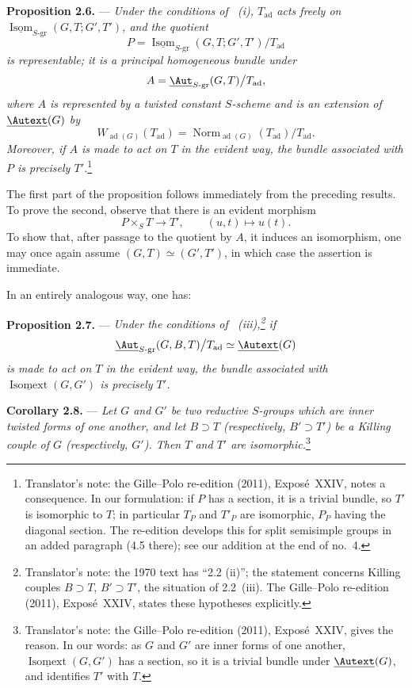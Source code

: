\medskip\noindent\textbf{Proposition 2.6.} ---
{\itshape Under the conditions of ~\textup{(i)},
\(T_{\mathrm{ad}}\) acts freely on
\(\underline{\operatorname{Isom}}_{S\text{-}\mathrm{gr}}
(G,T;G',T')\), and the quotient}
\[
  P=
  \underline{\operatorname{Isom}}_{S\text{-}\mathrm{gr}}
    (G,T;G',T')
  \big/T_{\mathrm{ad}}
\]
{\itshape is representable; it is a principal homogeneous bundle under}
\[
  A=
  \underline{\Aut}_{S\text{-}\mathrm{gr}}(G,T)
  \big/T_{\mathrm{ad}},
\]
{\itshape where \(A\) is represented by a twisted constant \(S\)-scheme
and is an extension of \(\underline{\Autext}(G)\) by}
\[
  W_{\operatorname{ad}(G)}(T_{\mathrm{ad}})
  =
  \operatorname{Norm}_{\operatorname{ad}(G)}(T_{\mathrm{ad}})
  \big/T_{\mathrm{ad}}.
\]
{\itshape Moreover, if \(A\) is made to act on \(T\) in the evident
way, the bundle associated with \(P\) is precisely \(T'\).}\footnote{Translator's note: the Gille--Polo re-edition (2011), Exposé~XXIV, notes a
consequence. In our formulation: if \(P\) has a section, it is a trivial bundle, so \(T'\) is
isomorphic to \(T\); in particular \(T_P\) and \(T'_P\) are isomorphic, \(P_P\) having the
diagonal section. The re-edition develops this for split semisimple groups in an added
paragraph (4.5 there); see our addition at the end of no.~4.}

The first part of the proposition follows immediately from the
preceding results. To prove the second, observe that there is an
evident morphism
\[
  P\times_S T\longrightarrow T',
  \qquad (u,t)\longmapsto u(t).
\]
To show that, after passage to the quotient by \(A\), it induces an
isomorphism, one may once again assume
\((G,T)\simeq(G',T')\), in which case the assertion is immediate.

In an entirely analogous way, one has:

\medskip\noindent\textbf{Proposition 2.7.} ---
{\itshape Under the conditions of ~\textup{(iii)},\footnote{Translator's
note: the 1970 text has ``2.2 (ii)''; the statement concerns Killing couples \(B\supset T\),
\(B'\supset T'\), the situation of 2.2~(iii). The Gille--Polo re-edition (2011), Exposé~XXIV,
states these hypotheses explicitly.} if
\[
  \underline{\Aut}_{S\text{-}\mathrm{gr}}(G,B,T)
  \big/T_{\mathrm{ad}}
  \simeq \underline{\Autext}(G)
\]
is made to act on \(T\) in the evident way, the bundle associated
with \(\underline{\operatorname{Isomext}}(G,G')\) is precisely
\(T'\).}

\medskip\noindent\textbf{Corollary 2.8.} ---
{\itshape Let \(G\) and \(G'\) be two reductive \(S\)-groups which are
inner twisted forms of one another, and let \(B\supset T\)
(respectively, \(B'\supset T'\)) be a Killing couple of \(G\)
(respectively, \(G'\)). Then \(T\) and \(T'\) are
isomorphic.}\footnote{Translator's note: the Gille--Polo re-edition (2011), Exposé~XXIV, gives the reason. In our words: as \(G\) and \(G'\)
are inner forms of one another, \(\underline{\operatorname{Isomext}}(G,G')\) has a section, so
it is a trivial bundle under \(\underline{\Autext}(G)\), and 
identifies \(T'\) with \(T\).}

